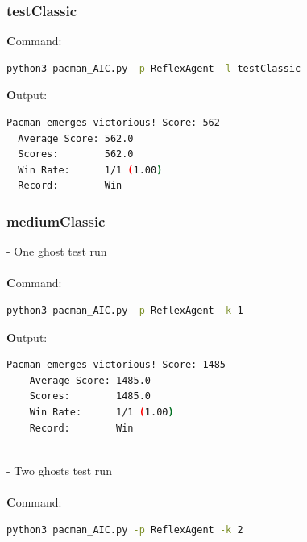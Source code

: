 \documentclass{article}
\begin{document}
\subsubsection{testClassic}
\label{sec:testClassic}

\textbf Command:

\begin{lstlisting}[language=bash, frame=tlbr, framesep=6pt, backgroundcolor=\color{light-gray}]
    python3 pacman_AIC.py -p ReflexAgent -l testClassic
\end{lstlisting}

\noindent\textbf Output:

\begin{lstlisting}[language=bash, frame=tlbr, framesep=6pt, backgroundcolor=\color{light-gray}]
  Pacman emerges victorious! Score: 562
  Average Score: 562.0
  Scores:        562.0
  Win Rate:      1/1 (1.00)
  Record:        Win
\end{lstlisting}

\subsubsection{mediumClassic}
\label{sec:mediumClassic}

- One ghost test run \\
~\\
\textbf Command:

\begin{lstlisting}[language=bash, frame=tlbr, framesep=6pt, backgroundcolor=\color{light-gray}]
    python3 pacman_AIC.py -p ReflexAgent -k 1
\end{lstlisting}

\noindent\textbf Output:

\begin{lstlisting}[language=bash, frame=tlbr, framesep=6pt, backgroundcolor=\color{light-gray}]
    Pacman emerges victorious! Score: 1485
    Average Score: 1485.0
    Scores:        1485.0
    Win Rate:      1/1 (1.00)
    Record:        Win
\end{lstlisting}

~\\
- Two ghosts test run \\
~\\
\textbf Command:

\begin{lstlisting}[language=bash, frame=tlbr, framesep=6pt, backgroundcolor=\color{light-gray}]
    python3 pacman_AIC.py -p ReflexAgent -k 2
\end{lstlisting}
\end{document}
